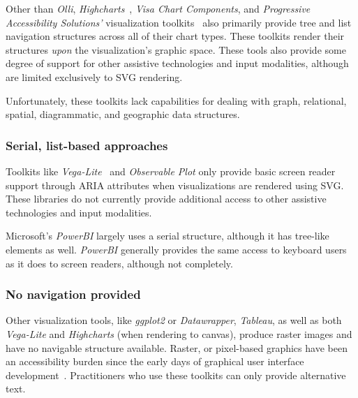 \documentclass[journal]{vgtc}                %
\begin{document}
Other than \textit{Olli}, \textit{Highcharts}~\cite{HighsoftHighcharts}, \textit{Visa Chart Components}, and \textit{Progressive Accessibility Solutions'} visualization toolkits~\cite{Sorge2016Polyfilling,Godfrey2018Accessible} also primarily provide tree and list navigation structures across all of their chart types. These toolkits render their structures \textit{upon} the visualization's graphic space. These tools also provide some degree of support for other assistive technologies and input modalities, although are limited exclusively to SVG rendering. 

Unfortunately, these toolkits lack capabilities for dealing with graph, relational, spatial, diagrammatic, and geographic data structures.

\subsubsection{Serial, list-based approaches}
Toolkits like \textit{Vega-Lite}~\cite{Satyanarayan2017VegaLite} and \textit{Observable Plot} only provide basic screen reader support through ARIA attributes when visualizations are rendered using SVG. These libraries do not currently provide additional access to other assistive technologies and input modalities.

Microsoft's \textit{PowerBI} largely uses a serial structure, although it has tree-like elements as well. \textit{PowerBI} generally provides the same access to keyboard users as it does to screen readers, although not completely.

\subsubsection{No navigation provided}
Other visualization tools, like \textit{ggplot2} or \textit{Datawrapper}, \textit{Tableau}, as well as both \textit{Vega-Lite} and \textit{Highcharts} (when rendering to canvas), produce raster images and have no navigable structure available. Raster, or pixel-based graphics have been an accessibility burden since the early days of graphical user interface development~\cite{Boyd1990Graphical}. Practitioners who use these toolkits can only provide alternative text.

\end{document}
